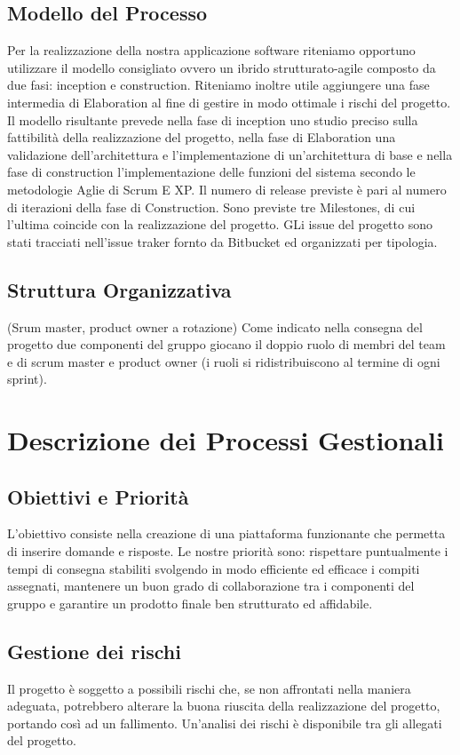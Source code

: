 \documentclass[paper=a4, fontsize=11pt]{scrartcl}
\numberwithin{equation}{section}		%
\numberwithin{figure}{section}			%
\numberwithin{table}{section}				%
\begin{document}
\subsection{Modello del Processo}
Per la realizzazione della nostra applicazione software riteniamo opportuno utilizzare il modello consigliato ovvero un ibrido strutturato-agile composto da due fasi: inception e construction. Riteniamo inoltre utile aggiungere una fase intermedia di Elaboration al fine di gestire in modo ottimale i rischi del progetto.\newline
Il modello risultante prevede nella fase di inception uno studio preciso sulla fattibilità della realizzazione del progetto, nella fase di Elaboration una validazione dell'architettura e l'implementazione di un'architettura di base e nella fase di construction l'implementazione delle funzioni del sistema secondo le metodologie Aglie di Scrum E XP. \newline
Il numero di release previste è pari al numero di iterazioni della fase di Construction. Sono previste tre Milestones, di cui l'ultima coincide con la realizzazione del progetto.
GLi issue del progetto sono stati tracciati nell'issue traker fornto da Bitbucket ed organizzati per tipologia.
\subsection{Struttura Organizzativa}
(Srum master, product owner a rotazione)
Come indicato nella consegna del progetto due componenti del gruppo giocano il doppio ruolo di membri del team e di scrum master e product owner (i ruoli si ridistribuiscono al termine di ogni sprint). 
\section{Descrizione dei Processi Gestionali}
\subsection{Obiettivi e Priorità}
L’obiettivo consiste nella creazione di una piattaforma funzionante che permetta di inserire domande e risposte. 
Le nostre priorità sono: rispettare puntualmente i tempi di consegna stabiliti svolgendo in modo efficiente ed efficace i compiti assegnati, mantenere un buon grado di collaborazione tra i componenti del gruppo e garantire un prodotto finale ben strutturato ed affidabile.
\subsection{Gestione dei rischi}
Il progetto è soggetto a possibili rischi che, se non affrontati nella maniera adeguata, potrebbero alterare la
buona riuscita della realizzazione del progetto, portando così ad un fallimento. Un'analisi dei rischi è disponibile tra gli allegati del progetto.
\end{document}
